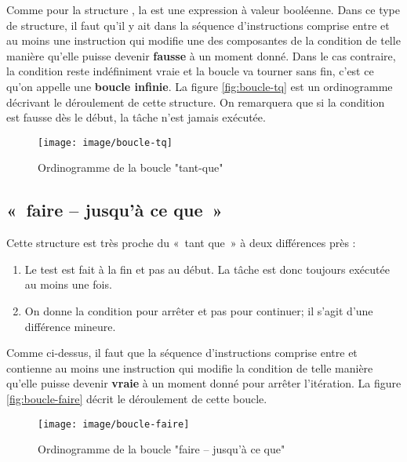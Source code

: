 		Comme pour la structure , la  est
		une expression à valeur booléenne. Dans ce type de structure, il faut
		qu’il y ait dans la séquence d’instructions comprise entre
		 et  au moins une
		instruction qui modifie une des composantes de la condition de telle
		manière qu’elle puisse devenir \textbf{fausse} à un moment donné. Dans
		le cas contraire, la condition reste indéfiniment vraie et la boucle va
		tourner sans fin, c'est ce qu'on appelle une \textbf{boucle infinie}. 
		La figure \vref{fig:boucle-tq} est un ordinogramme 
		décrivant le déroulement de cette structure. 
		On remarquera que si la condition est fausse dès le début, 
		la tâche n'est jamais exécutée.

		\begin{figure}[h]
		\centering
		\texttt{[image: image/boucle-tq]}
		\caption{Ordinogramme de la boucle "tant-que"}
		\label{fig:boucle-tq}
		\end{figure}
		
	\subsection{«~faire – jusqu'à ce que~»}

		Cette structure est très proche du «~tant que~» 
		à deux différences près :
	
		\begin{enumerate}
		\item {
			Le test est fait à la fin et pas au début. La tâche est donc toujours
			exécutée au moins une fois. }
		\item {
			On donne la condition pour arrêter et pas pour continuer; il
			s'agit d'une différence mineure.}
		\end{enumerate}


		Comme ci-dessus, il faut que la séquence d’instructions comprise entre
		 et  
		contienne au moins une instruction qui modifie la condition de
		telle manière qu’elle puisse devenir \textbf{vraie} à un moment donné
		pour arrêter l'itération. 
		La figure \vref{fig:boucle-faire} décrit le déroulement de cette boucle. 

		\begin{figure}[h]
		\centering
		\texttt{[image: image/boucle-faire]}
		\caption{Ordinogramme de la boucle "faire – jusqu'à ce que"}
		\label{fig:boucle-faire}
		\end{figure}

